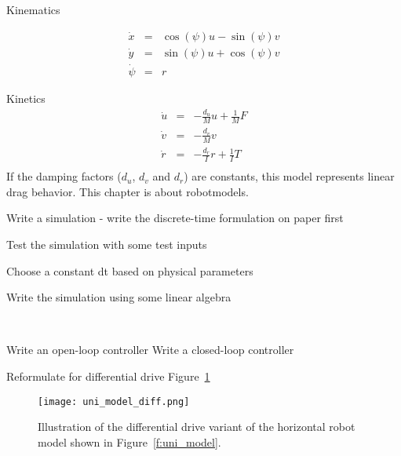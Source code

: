Kinematics

\begin{eqnarray}
\dot{x} & = & \cos{(\psi)}u - \sin{(\psi)}v \\
\dot{y} & = & \sin{(\psi)}u + \cos{(\psi)}v \\
\dot{\psi} & = & r
\end{eqnarray}

Kinetics
\begin{eqnarray}
\dot{u} & = & -\frac{d_u}{M}u + \frac{1}{M}F \\
\dot{v} & = & -\frac{d_v}{M}v \\
\dot{r} & = & -\frac{d_r}{I}r + \frac{1}{I}T \\
\end{eqnarray}
If the damping factors ($d_u$, $d_v$ and $d_r$) are constants, this model represents linear drag behavior.
This chapter is about \gls{robotmodel}s.

\begin{ex}
Write a simulation - write the discrete-time formulation on paper first
\end{ex}

\begin{ex}
Test the simulation with some test inputs
\end{ex}

\begin{ex}
Choose a constant dt based on physical parameters
\end{ex}

\begin{ex}
Write the simulation using some linear algebra
\end{ex}

\
\begin{ex}
Write an open-loop  controller
Write a closed-loop controller
\end{ex}

\begin{ex}
Reformulate for differential drive
Figure~\ref{f:uni_model_diff}
\end{ex}

\begin{figure}[hbt]
\centering
\texttt{[image: uni\_model\_diff.png]}
\caption{Illustration of the differential drive variant of the horizontal robot model shown in Figure~\ref{f:uni_model}.}
\label{f:uni_model_diff}
\end{figure}
